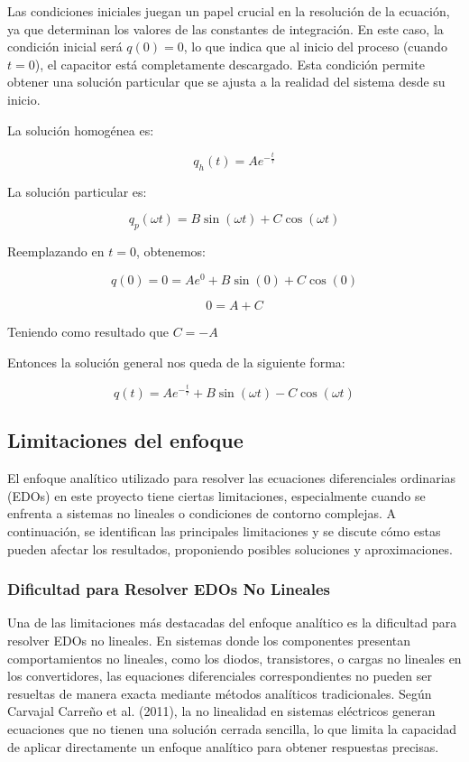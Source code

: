 Las condiciones iniciales juegan un papel crucial en la resolución de la ecuación, ya que
determinan los valores de las constantes de integración. En este caso, la condición inicial será
\(q(0) = 0\), lo que indica que al inicio del proceso (cuando \(t = 0\)), el capacitor está
completamente descargado. Esta condición permite obtener una solución particular que se
ajusta a la realidad del sistema desde su inicio.

La solución homogénea es:

\[
    q_h(t) = A e^{-\frac{t}{\tau}}
\]

La solución particular es:

\[
    q_p(\omega t) = B \sin(\omega t) + C \cos(\omega t)
\]

Reemplazando en \(t = 0\), obtenemos:

\[
    q(0) = 0 = A e^{0} + B \sin(0) + C \cos(0)
\]

\[
    0 = A + C
\]

Teniendo como resultado que \(C = -A\)

Entonces la solución general nos queda de la siguiente forma:

\[
    q(t) = A e^{-\frac{t}{\tau}} + B \sin(\omega t) - C \cos(\omega t)
\]

\subsection{Limitaciones del enfoque}
El enfoque analítico utilizado para resolver las ecuaciones diferenciales ordinarias (EDOs) en este
proyecto tiene ciertas limitaciones, especialmente cuando se enfrenta a sistemas no lineales o
condiciones de contorno complejas. A continuación, se identifican las principales limitaciones y se
discute cómo estas pueden afectar los resultados, proponiendo posibles soluciones y aproximaciones.

\subsubsection*{Dificultad para Resolver EDOs No Lineales}
Una de las limitaciones más destacadas del enfoque analítico es la dificultad para resolver
EDOs no lineales. En sistemas donde los componentes presentan comportamientos no
lineales, como los diodos, transistores, o cargas no lineales en los convertidores, las
equaciones diferenciales correspondientes no pueden ser resueltas de manera exacta mediante
métodos analíticos tradicionales. Según Carvajal Carreño et al. (2011), la no linealidad en
sistemas eléctricos generan ecuaciones que no tienen una solución cerrada sencilla, lo que
limita la capacidad de aplicar directamente un enfoque analítico para obtener respuestas
precisas.


